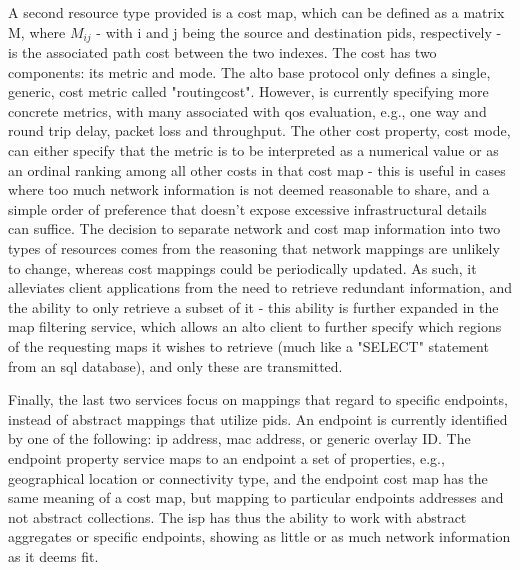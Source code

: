     A second resource type provided is a cost map, which can be defined as a matrix M, where $M_{ij}$ - with i and j being the source and destination \glspl{pid}, respectively - is the associated path cost between the two indexes.
    The cost has two components: its metric and mode.
    The \gls{alto} base protocol only defines a single, generic, cost metric called "routingcost".
    However, \cite{alto-metrics} is currently specifying more concrete metrics, with many associated with \gls{qos} evaluation, e.g., one way and round trip delay, packet loss and throughput.
    The other cost property, cost mode, can either specify that the metric is to be interpreted as a numerical value or as an ordinal ranking among all other costs in that cost map - this is useful in cases where too much network information is not deemed reasonable to share, and a simple order of preference that doesn't expose excessive infrastructural details can suffice.
    The decision to separate network and cost map information into two types of resources comes from the reasoning that network mappings are unlikely to change, whereas cost mappings could be periodically updated.
    As such, it alleviates client applications from the need to retrieve redundant information, and the ability to only retrieve a subset of it - this ability is further expanded in the map filtering service, which allows an \gls{alto} client to further specify which regions of the requesting maps it wishes to retrieve (much like a "SELECT" statement from an \gls{sql} database), and only these are transmitted.

    Finally, the last two services focus on mappings that regard to specific endpoints, instead of abstract mappings that utilize \glspl{pid}.
    An endpoint is currently identified by one of the following: \gls{ip} address, \gls{mac} address, or generic overlay ID.
    The endpoint property service maps to an endpoint a set of properties, e.g., geographical location or connectivity type, and the endpoint cost map has the same meaning of a cost map, but mapping to particular endpoints addresses and not abstract collections.
    The \gls{isp} has thus the ability to work with abstract aggregates or specific endpoints, showing as little or as much network information as it deems fit.

